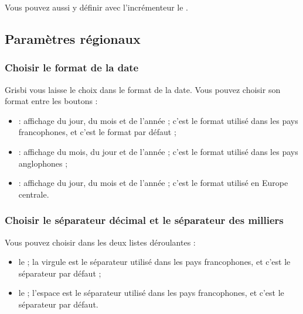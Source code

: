 \ifIllustration
\fi

Vous pouvez aussi y définir avec l'incrémenteur le .

\ifIllustration
\fi

\subsection{Paramètres régionaux\label{setup-general-localisation}}


\subsubsection{Choisir le format de la date}

Grisbi vous laisse le choix dans le format de la date. Vous pouvez choisir son format entre les boutons :
\begin{itemize}
	\item {} : affichage du jour, du mois et de l'année ; c'est le format utilisé dans les pays francophones, et c'est le format par défaut ;    
	\item {} : affichage du mois, du jour et de l'année ; c'est le format utilisé dans les pays anglophones ;
	\item {} : affichage du jour, du mois et de l'année ; c'est le format utilisé en Europe centrale.	
\end{itemize}


\subsubsection{Choisir le séparateur décimal et le séparateur des milliers}

Vous pouvez choisir dans les deux listes déroulantes :
\begin{itemize}
	\item le  ; la virgule est le séparateur utilisé dans les pays francophones, et c'est le séparateur par défaut ;    
	\item le  ; l'espace est le séparateur utilisé dans les pays francophones, et c'est le séparateur par défaut.
\end{itemize}


